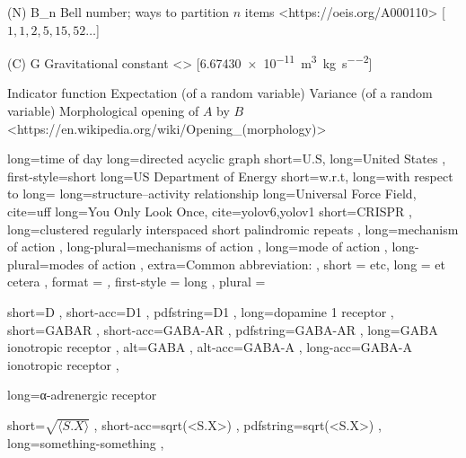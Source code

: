 \NomMath (N) {B_n} {Bell number; ways to partition $n$ items}
    <https://oeis.org/A000110>
    [{$1, 1, 2, 5, 15, 52 \ldots$}]

\NomMath (C) {G} {Gravitational constant}
    <>
    [\qty{6.67430e-11}{\meter\cubed\per\kilogram\per\second\squared}]

\NomMath {\indicator} {Indicator function}
 {Expectation (of a random variable)}
 {Variance (of a random variable)}
    {Morphological opening of $A$ by $B$}
    <https://en.wikipedia.org/wiki/Opening\_(morphology)>




 {long=time of day}  %
 {long=directed acyclic graph}
 {
    short=U.S\acdot ,
    long=United States ,
    first-style=short     %
}
 {long=\acs{US} Department of Energy}
 {short=w.r.t\acdot, long=with respect to}
 {long=}
 {long=structure–activity relationship}  %
 {long=Universal Force Field, cite=uff}
 {long=You Only Look Once, cite={yolov6,yolov1}}
 {
    short=CRISPR ,
    long=clustered regularly interspaced short palindromic repeats ,
}
 {
    long=mechanism of action ,
	long-plural=mechanisms of action ,
}
 {
    long=mode of action ,
	long-plural=modes of action ,
	extra={Common abbreviation: } ,
}
 {
    short = etc\acdot ,
    long = et cetera ,
    format = \textit ,
    first-style = long ,
    plural =
}

 {
    short=D ,
    short-acc=D1 ,
    pdfstring=D1 ,
    long=dopamine 1 receptor ,
}
 {
    short=GABAR ,
    short-acc=GABA-AR ,
    pdfstring=GABA-AR ,
    long=GABA ionotropic receptor ,
    alt=GABA ,
    alt-acc=GABA-A ,
    long-acc=GABA-A ionotropic receptor ,
}

 {long=α-adrenergic receptor}

 {
    short=$\sqrt{\langle S . X \rangle }$ ,
    short-acc=sqrt(<S.X>) ,
    pdfstring=sqrt(<S.X>) ,
    long=something-something ,
}


